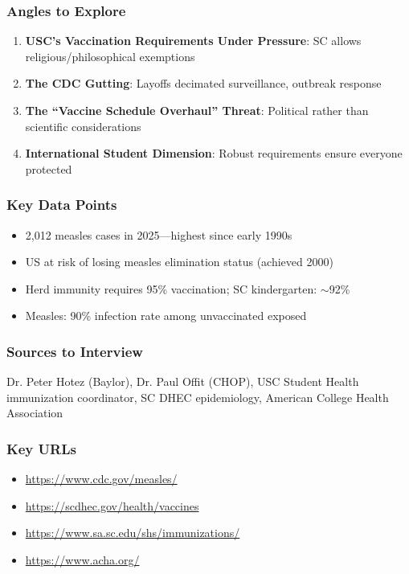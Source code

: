 \documentclass[11pt,letterpaper]{article}
\begin{document}
\subsubsection*{Angles to Explore}
\begin{enumerate}[noitemsep]
    \item \textbf{USC's Vaccination Requirements Under Pressure}: SC allows religious/philosophical exemptions
    \item \textbf{The CDC Gutting}: Layoffs decimated surveillance, outbreak response
    \item \textbf{The ``Vaccine Schedule Overhaul'' Threat}: Political rather than scientific considerations
    \item \textbf{International Student Dimension}: Robust requirements ensure everyone protected
\end{enumerate}

\subsubsection*{Key Data Points}
\begin{itemize}[noitemsep]
    \item 2,012 measles cases in 2025---highest since early 1990s
    \item US at risk of losing measles elimination status (achieved 2000)
    \item Herd immunity requires 95\% vaccination; SC kindergarten: $\sim$92\%
    \item Measles: 90\% infection rate among unvaccinated exposed
\end{itemize}

\subsubsection*{Sources to Interview}
Dr. Peter Hotez (Baylor), Dr. Paul Offit (CHOP), USC Student Health immunization coordinator, SC DHEC epidemiology, American College Health Association

\subsubsection*{Key URLs}
\begin{itemize}[noitemsep]
    \item \url{https://www.cdc.gov/measles/}
    \item \url{https://scdhec.gov/health/vaccines}
    \item \url{https://www.sa.sc.edu/shs/immunizations/}
    \item \url{https://www.acha.org/}
\end{itemize}
\end{document}
